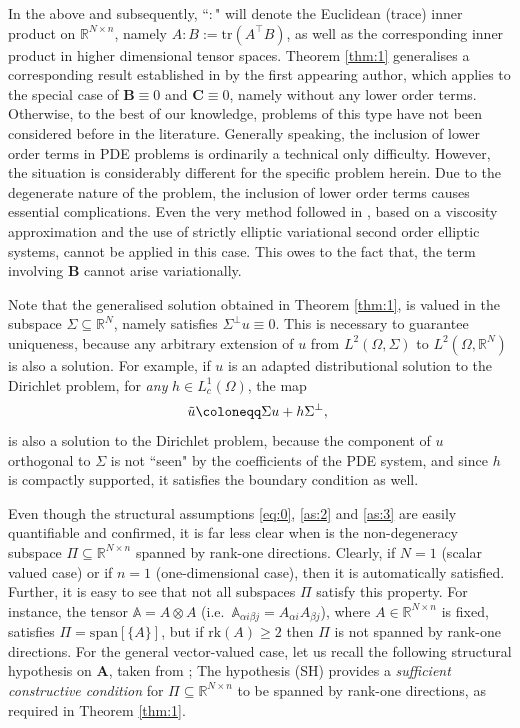 \documentclass{amsart}
\numberwithin{equation}{section}
\numberwithin{thm}{section}
\theoremstyle{definition}
\def\R{\mathbb{R}}
\renewcommand{\:}{\!:\!} %
\newcommand{\al}{\alpha}
\newcommand{\be}{\beta}
\newcommand{\Si}{\Sigma}
\newcommand{\sub}{\subseteq}
\newcommand{\by}{\times}
\renewcommand{\^}[1]{^{#1}_{\phantom{l}}}
\begin{document}
In the above and subsequently, ``$:$" will denote the Euclidean (trace) inner product on $\R^{N\by n}$, namely $A:B:=\mathrm{tr}(A^\top B)$, as well as the corresponding inner product in higher dimensional tensor spaces. Theorem \ref{thm:1} generalises a corresponding result established in \cite{nikos1} by the first appearing author, which applies to the special case of $\mathbf{B}\equiv 0$ and $\mathbf{C}\equiv 0$, namely without any lower order terms. Otherwise, to the best of our knowledge, problems of this type have not been considered before in the literature. Generally speaking, the inclusion of lower order terms in PDE problems is ordinarily a technical only difficulty. However, the situation is considerably different for the specific problem herein. Due to the degenerate nature of the problem, the inclusion of lower order terms causes essential complications. Even the very method followed in \cite{nikos1}, based on a viscosity approximation and the use of strictly elliptic variational second order elliptic systems, cannot be applied in this case. This owes to the fact that, the term involving $\mathbf{B}$ cannot arise variationally.

Note that the generalised solution obtained in Theorem \ref{thm:1}, is valued in the subspace $\Si\sub \R^N$, namely satisfies $\Sigma^{\perp}u \equiv 0$. This is necessary to guarantee uniqueness, because any arbitrary extension of $u$ from $L^2(\Omega, \Sigma)$ to $L^2(\Omega, \mathbb{R}^N)$ is also a solution. For example, if $u$ is an adapted distributional solution to the Dirichlet problem, for {\it any} $h \in L^1_{c}(\Omega)$, the map
\[
\tilde{u} \coloneqq \Sigma u + h\Sigma^\perp , \hspace{0.1cm}
\]
is also a solution to the Dirichlet problem, because the component of $u$ orthogonal to $\Si$ is not ``seen" by the coefficients of the PDE system, and since $h$ is compactly supported, it satisfies the boundary condition as well.

Even though the structural assumptions \eqref{eq:0}, \eqref{as:2} and \eqref{as:3} are easily quantifiable and confirmed, it is far less clear when is the non-degeneracy subspace $\Pi \sub \R^{N\by n}$ spanned by rank-one directions. Clearly, if $N=1$ (scalar valued case) or if $n=1$ (one-dimensional case), then it is automatically satisfied. Further, it is easy to see that not all subspaces $\Pi$ satisfy this property. For instance, the tensor $\mathbb A=A \otimes A$ (i.e.\ $\mathbb A_{\al i \be j} = A_{\al i} A_{\be j}$), where $A \in  \R^{N\by n}$ is fixed, satisfies $\Pi = \mathrm{span}[\{A\}]$, but if $\mathrm{rk}(A)\geq 2$ then $\Pi$ is not spanned by rank-one directions. For the general vector-valued case, let us recall the following structural hypothesis on $\mathbf{A}$,  taken from \cite{nikos1}; The hypothesis (SH) provides a {\it sufficient constructive condition} for $\Pi \sub \R^{N\by n}$ to be spanned by rank-one directions, as required in Theorem \ref{thm:1}.
\end{document}
